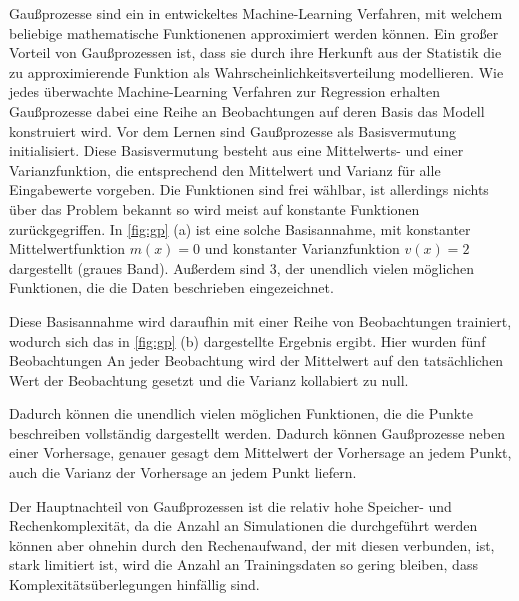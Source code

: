 Gaußprozesse sind ein in \cite{Rasmussen.2008} entwickeltes Machine-Learning Verfahren, mit welchem beliebige mathematische Funktionenen approximiert werden können.
Ein großer Vorteil von Gaußprozessen ist, dass sie durch ihre Herkunft aus der Statistik die zu approximierende Funktion als Wahrscheinlichkeitsverteilung modellieren.
Wie jedes überwachte Machine-Learning Verfahren zur Regression erhalten Gaußprozesse dabei eine Reihe an Beobachtungen auf deren Basis das Modell konstruiert wird.
Vor dem Lernen sind Gaußprozesse als Basisvermutung initialisiert.
Diese Basisvermutung besteht aus eine Mittelwerts- und einer Varianzfunktion, die entsprechend den Mittelwert und Varianz für alle Eingabewerte vorgeben.
Die Funktionen sind frei wählbar, ist allerdings nichts über das Problem bekannt so wird meist auf konstante Funktionen zurückgegriffen.
In \ref{fig:gp} (a) ist eine solche Basisannahme, mit konstanter Mittelwertfunktion $m(x)=0$ und konstanter Varianzfunktion $v(x)=2$ dargestellt (graues Band).
Außerdem sind 3, der unendlich vielen möglichen Funktionen, die die Daten beschrieben eingezeichnet.

Diese Basisannahme wird daraufhin mit einer Reihe von Beobachtungen trainiert, wodurch sich das in \ref{fig:gp} (b) dargestellte Ergebnis ergibt.
Hier wurden fünf Beobachtungen 
An jeder Beobachtung wird der Mittelwert auf den tatsächlichen Wert der Beobachtung gesetzt und die Varianz kollabiert zu null.


Dadurch können die unendlich vielen möglichen Funktionen, die die Punkte beschreiben vollständig dargestellt werden.
Dadurch können Gaußprozesse neben einer Vorhersage, genauer gesagt dem Mittelwert der Vorhersage an jedem Punkt, auch die Varianz der Vorhersage an jedem Punkt liefern.
%



Der Hauptnachteil von Gaußprozessen ist die relativ hohe Speicher- und Rechenkomplexität, da die Anzahl an Simulationen die durchgeführt werden können aber ohnehin durch den Rechenaufwand, der mit diesen verbunden, ist, stark limitiert ist, wird die Anzahl an Trainingsdaten so gering bleiben, dass Komplexitätsüberlegungen hinfällig sind.

